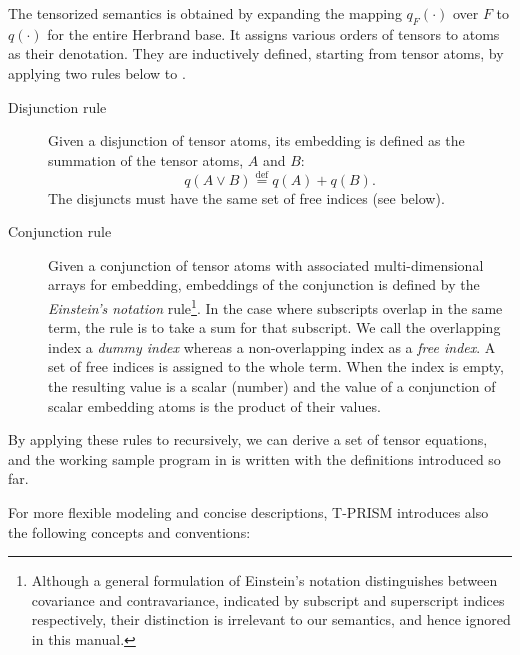 \documentclass[a4paper]{report}
\newcommand{\defeq}{\ensuremath{\stackrel{\mathrm{def}}{=}}}
\begin{document}
The  tensorized  semantics  is   obtained  by  expanding  the  mapping
$q_F(\cdot)$ over $F$  to $q(\cdot)$ for the entire  Herbrand base. It
assigns various orders  of tensors to atoms as  their denotation. They
are inductively defined,  starting from tensor atoms,  by applying two
rules below to .
\begin{description}
	\item [Disjunction rule]
	Given a disjunction of tensor atoms, its embedding
	is defined as the summation of the tensor atoms, $A$ and $B$:
	\[q(A \vee B) \defeq q(A)+ q(B).\]
	The disjuncts must have the same set of free indices (see below).
	\item [Conjunction rule]
	Given a conjunction of tensor atoms with associated multi-dimensional
	arrays for embedding, embeddings of the conjunction is defined by the
	{\em Einstein's notation\/} rule\footnote{
		Although a general formulation of Einstein's notation distinguishes
		between covariance and contravariance, indicated by subscript and
		superscript indices respectively, their distinction is irrelevant to
		our semantics, and hence ignored in this manual.
	}.  In the case where subscripts overlap in the same term, the rule is
	to take a sum for that subscript. We call the overlapping index a {\em
		dummy  index\/}  whereas  a  non-overlapping  index  as  a  {\em  free
		index\/}. A  set of free indices  is assigned to the  whole term. When
	the index is  empty, the resulting value is a  scalar (number) and the
	value of  a conjunction of  scalar embedding  atoms is the  product of
	their values.
\end{description}
%
By applying  these rules  to   recursively, we
can derive a  set of tensor equations, and the  working sample program
in  is written with the definitions introduced
so far.

For more flexible modeling  and concise descriptions, T-PRISM introduces
also the following concepts and conventions:
\end{document}
